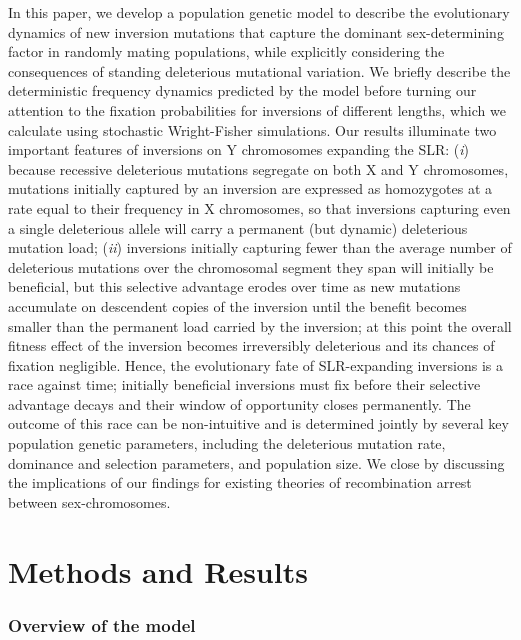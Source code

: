 \documentclass[11pt]{article}
\begin{document}
In this paper, we develop a population genetic model to describe the evolutionary dynamics of new inversion mutations that capture the dominant sex-determining factor in randomly mating populations, while explicitly considering the consequences of standing deleterious mutational variation. We briefly describe the deterministic frequency dynamics predicted by the model before turning our attention to the fixation probabilities for inversions of different lengths, which we calculate using stochastic Wright-Fisher simulations. Our results illuminate two important features of inversions on Y chromosomes expanding the SLR: ({\itshape i}) because recessive deleterious mutations segregate on both X and Y chromosomes, mutations initially captured by an inversion are expressed as homozygotes at a rate equal to their frequency in X chromosomes, so that inversions capturing even a single deleterious allele will carry a permanent (but dynamic) deleterious mutation load; ({\itshape ii}) inversions initially capturing fewer than the average number of deleterious mutations over the chromosomal segment they span will initially be beneficial, but this selective advantage erodes over time as new mutations accumulate on descendent copies of the inversion until the benefit becomes smaller than the permanent load carried by the inversion; at this point the overall fitness effect of the inversion becomes irreversibly deleterious and its chances of fixation negligible. Hence, the evolutionary fate of SLR-expanding inversions is a race against time; initially beneficial inversions must fix before their selective advantage decays and their window of opportunity closes permanently. The outcome of this race can be non-intuitive and is determined jointly by several key population genetic parameters, including the deleterious mutation rate, dominance and selection parameters, and population size. We close by discussing the implications of our findings for existing theories of recombination arrest between sex-chromosomes.




\section*{Methods and Results}

\subsubsection*{Overview of the model}
\end{document}
